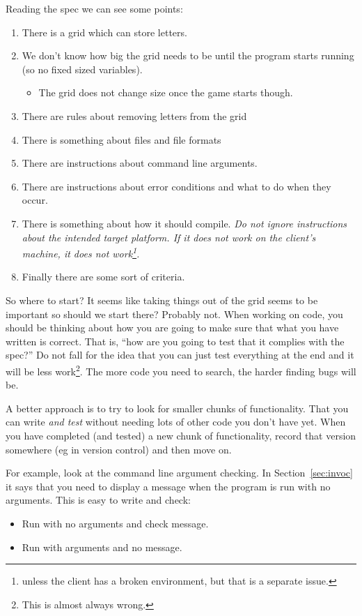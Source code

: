 Reading the spec we can see some points:
\begin{enumerate}
 \item There is a grid which can store letters.
 \item We don't know how big the grid needs to be until the program starts running (so no fixed sized variables).
 \begin{itemize}
  \item The grid does not change size once the game starts though.
 \end{itemize}
 \item There are rules about removing letters from the grid
 \item There is something about files and file formats
\item There are instructions about command line arguments.
 \item There are instructions about error conditions and what to do when they occur.
 \item There is something about how it should compile. \emph{Do not ignore instructions about the intended target platform. 
 If it does not work on the client's machine, it does not work\footnote{unless the client has a broken environment, but that
 is a separate issue.}.}
 \item Finally there are some sort of criteria.
\end{enumerate}

So where to start?
It seems like taking things out of the grid seems to be important so should we start there?
Probably not.
When working on code, you should be thinking about how you are going to make sure that what you have written is correct.
That is, ``how are you going to test that it complies with the spec?''
Do not fall for the idea that you can just test everything at the end and it will be less work\footnote{This is almost always wrong.}.
The more code you need to search, the harder finding bugs will be.

A better approach is to try to look for smaller chunks of functionality.
That you can write \emph{and test} without needing lots of other code you don't have yet.
When you have completed (and tested) a new chunk of functionality, record that version somewhere (eg in version control)
and then move on.

For example, look at the command line argument checking.
In Section~\ref{sec:invoc} it says that you need to display a message when the program is run with no arguments.
This is easy to write and check:
\begin{itemize}
 \item Run with no arguments and check message.
 \item Run with arguments and no message.
\end{itemize}

